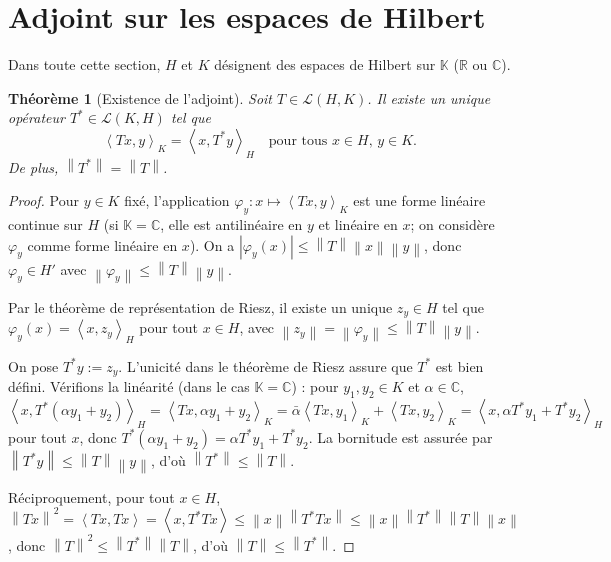 \documentclass[a4paper,12pt]{book}
\newcommand{\R}{\mathbb{R}}
\newcommand{\C}{\mathbb{C}}
\newcommand{\K}{\mathbb{K}}
\newcommand{\norm}[1]{\left\| #1 \right\|}
\newcommand{\abs}[1]{\left| #1 \right|}
\newcommand{\inner}[2]{\left\langle #1, #2 \right\rangle}
\theoremstyle{definition}
\theoremstyle{plain}
\newtheorem{theoreme}[definition]{Théorème}
\theoremstyle{remark}
\begin{document}

\section{Adjoint sur les espaces de Hilbert}
\label{sec:adjoint-hilbert}


Dans toute cette section, $H$ et $K$ désignent des espaces de Hilbert
sur $\K$ ($\R$ ou $\C$).

\begin{theoreme}[Existence de l'adjoint]\label{thm:adjoint-existence}
Soit $T \in \mathcal{L}(H, K)$. Il existe un unique opérateur
$T^* \in \mathcal{L}(K, H)$ tel que
\[
    \inner{Tx}{y}_K = \inner{x}{T^*y}_H \quad
    \text{pour tous } x \in H,\, y \in K.
\]
De plus, $\norm{T^*} = \norm{T}$.
\end{theoreme}

\begin{proof}
Pour $y \in K$ fixé, l'application $\varphi_y : x \mapsto \inner{Tx}{y}_K$ est une
forme linéaire continue sur $H$ (si $\K = \C$, elle est antilinéaire en $y$ et linéaire
en $x$; on considère $\varphi_y$ comme forme linéaire en $x$). On a
$\abs{\varphi_y(x)} \leq \norm{T}\norm{x}\norm{y}$, donc $\varphi_y \in H'$ avec
$\norm{\varphi_y} \leq \norm{T}\norm{y}$.

Par le théorème de représentation de Riesz,
il existe un unique $z_y \in H$ tel que $\varphi_y(x) = \inner{x}{z_y}_H$ pour tout
$x \in H$, avec $\norm{z_y} = \norm{\varphi_y} \leq \norm{T}\norm{y}$.

On pose $T^*y := z_y$. L'unicité dans le théorème de Riesz assure que $T^*$ est bien
défini. Vérifions la linéarité (dans le cas $\K = \C$) : pour $y_1, y_2 \in K$ et
$\alpha \in \C$,
\[
    \inner{x}{T^*(\alpha y_1 + y_2)}_H = \inner{Tx}{\alpha y_1 + y_2}_K
    = \bar{\alpha}\inner{Tx}{y_1}_K + \inner{Tx}{y_2}_K
    = \inner{x}{\alpha T^*y_1 + T^*y_2}_H
\]
pour tout $x$, donc $T^*(\alpha y_1 + y_2) = \alpha T^*y_1 + T^*y_2$.
La bornitude est assurée par $\norm{T^*y} \leq \norm{T}\norm{y}$, d'où
$\norm{T^*} \leq \norm{T}$.

Réciproquement, pour tout $x \in H$,
$\norm{Tx}^2 = \inner{Tx}{Tx} = \inner{x}{T^*Tx} \leq \norm{x}\norm{T^*Tx}
\leq \norm{x}\norm{T^*}\norm{T}\norm{x}$,
donc $\norm{T}^2 \leq \norm{T^*}\norm{T}$, d'où $\norm{T} \leq \norm{T^*}$.
\end{proof}
\end{document}
